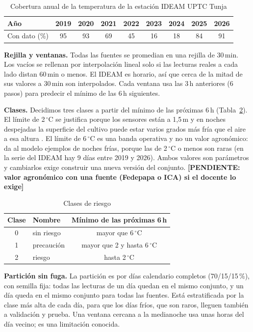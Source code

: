 \documentclass[conference]{IEEEtran}
\newcommand{\pend}[1]{\textcolor{red!70!black}{\textbf{[PENDIENTE: #1]}}}
\begin{document}
\begin{table}[t]
\caption{Cobertura anual de la temperatura de la estaci\'on IDEAM UPTC Tunja}
\label{tab:cob}
\centering
\footnotesize\setlength{\tabcolsep}{2.5pt}
\begin{tabular}{@{}lcccccccc@{}}
\toprule
A\~no & 2019 & 2020 & 2021 & 2022 & 2023 & 2024 & 2025 & 2026 \\
\midrule
Con dato (\%) & 95 & 93 & 69 & 45 & 16 & 18 & 84 & 91 \\
\bottomrule
\end{tabular}
\end{table}

\textbf{Rejilla y ventanas.} Todas las fuentes se promedian en una rejilla de 30\,min. Los vac\'ios se rellenan por interpolaci\'on lineal solo si las lecturas reales a cada lado distan 60\,min o menos. El IDEAM es horario, as\'i que cerca de la mitad de sus valores a 30\,min son interpolados. Cada ventana usa las 3\,h anteriores (6 pasos) para predecir el m\'inimo de las 6\,h siguientes.

\textbf{Clases.} Decidimos tres clases a partir del m\'inimo de las pr\'oximas 6\,h (Tabla~\ref{tab:clases}). El l\'imite de 2\,$^\circ$C se justifica porque los sensores est\'an a 1,5\,m y en noches despejadas la superficie del cultivo puede estar varios grados m\'as fr\'ia que el aire a esa altura \cite{fao_frost}. El l\'imite de 6\,$^\circ$C es una banda operativa y no un valor agron\'omico: da al modelo ejemplos de noches fr\'ias, porque las de 2\,$^\circ$C o menos son raras (en la serie del IDEAM hay 9 d\'ias entre 2019 y 2026). Ambos valores son par\'ametros y cambiarlos exige construir una nueva versi\'on del conjunto. \pend{valor agron\'omico con una fuente (Fedepapa o ICA) si el docente lo exige}

\begin{table}[t]
\caption{Clases de riesgo}
\label{tab:clases}
\centering
\begin{tabular}{@{}clc@{}}
\toprule
Clase & Nombre & M\'inimo de las pr\'oximas 6\,h \\
\midrule
0 & sin riesgo & mayor que 6\,$^\circ$C \\
1 & precauci\'on & mayor que 2 y hasta 6\,$^\circ$C \\
2 & riesgo & hasta 2\,$^\circ$C \\
\bottomrule
\end{tabular}
\end{table}

\textbf{Partici\'on sin fuga.} La partici\'on es por d\'ias calendario completos (70/15/15\,\%), con semilla fija: todas las lecturas de un d\'ia quedan en el mismo conjunto, y un d\'ia queda en el mismo conjunto para todas las fuentes. Est\'a estratificada por la clase m\'as alta de cada d\'ia, para que los d\'ias fr\'ios, que son raros, lleguen tambi\'en a validaci\'on y prueba. Una ventana cercana a la medianoche usa unas horas del d\'ia vecino; es una limitaci\'on conocida.
\end{document}
